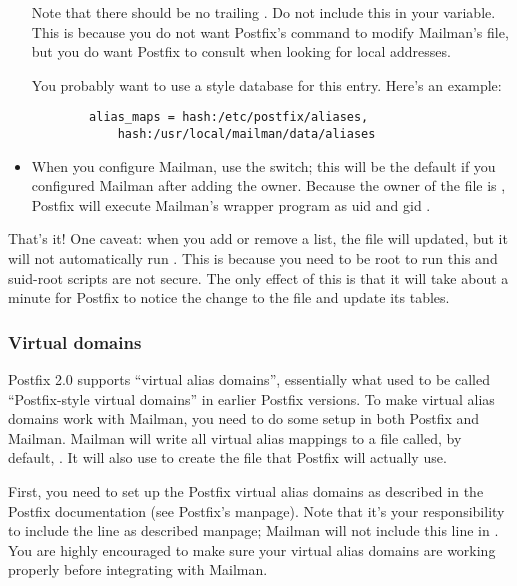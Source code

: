 \documentclass{howto}
\begin{document}
\begin{itemize}
      Note that there should be no trailing .  Do not include this
      in your  variable.  This is because you do not want
      Postfix's  command to modify Mailman's
       file, but you do want Postfix to consult
       when looking for local addresses.

      You probably want to use a  style database for this entry.
      Here's an example:

      \begin{verbatim}
        alias_maps = hash:/etc/postfix/aliases,
            hash:/usr/local/mailman/data/aliases
      \end{verbatim}

\item When you configure Mailman, use the
       switch; this will be the default
      if you configured Mailman after adding the  owner.
      Because the owner of the  file is ,
      Postfix will execute Mailman's wrapper program as uid and gid
      .

\end{itemize}

That's it!  One caveat: when you add or remove a list, the 
file will updated, but it will not automatically run .
This is because you need to be root to run this and suid-root scripts are not
secure.  The only effect of this is that it will take about a minute for
Postfix to notice the change to the  file and update its
tables.

\subsubsection{Virtual domains\label{postfix-virtual}}

Postfix 2.0 supports ``virtual alias domains'', essentially what used to be
called ``Postfix-style virtual domains'' in earlier Postfix versions.  To make
virtual alias domains work with Mailman, you need to do some setup in both
Postfix and Mailman.  Mailman will write all virtual alias mappings to a file
called, by default, .  It will
also use  to create the  file
that Postfix will actually use.

First, you need to set up the Postfix virtual alias domains as described in
the Postfix documentation (see Postfix's  manpage).  Note
that it's your responsibility to include the  line as described manpage; Mailman will not include this line in
.  You are highly encouraged to make sure your virtual
alias domains are working properly before integrating with Mailman.
\end{document}

